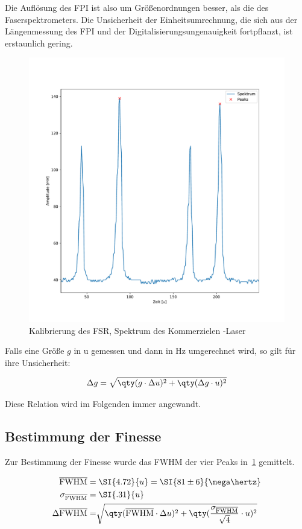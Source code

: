 \documentclass[slug=GL, room=HZDR\ Dresden/Rossendorf\,\ Geb.\ 620/123, supervisor=Tim\ Ziegler]{../../Lab_Report_LaTeX/lab_report}
\newcommand{\hne}{\ce{HeNe}-Laser}
\begin{document}
Die Aufl\"osung des FPI ist also um Gr\"o\ss{}enordnungen besser, als
die des Faserspektrometers.  Die Unsicherheit der Einheitsumrechnung,
die sich aus der L\"angenmessung des FPI und der
Digitalisierungsungenauigkeit fortpflanzt, ist erstaunlich gering.

\begin{figure}[b]\centering
  \includegraphics[width=.8\columnwidth]{figs/fsrkalib.pdf}
  \caption{Kalibrierung des FSR, Spektrum des Kommerzielen \hne{}}
  \label{fig:fsrkalib}
\end{figure}

Falls eine Gr\"o\ss{}e \(g\) in \si{u} gemessen und dann in \si{\hertz}
umgerechnet wird, so gilt f\"ur ihre Unsicherheit:

\begin{equation}
  \label{eq:uerr}
  \Delta g = \sqrt{\qty(g\cdot\Delta u)^2 + \qty(\Delta g\cdot u)^2}
\end{equation}

Diese Relation wird im Folgenden immer angewandt.

\subsection{Bestimmung der Finesse}
\label{sec:bestfinesse}

Zur Bestimmung der Finesse wurde das FWHM der vier Peaks
in~\ref{fig:fsrkalib} gemittelt.

\begin{align}
  \label{eq:fwhmlaser}
  \overline{\text{FWHM}} =&\; \SI{4.72}{u} = \SI{81\pm
  6}{\mega\hertz} \\
  \sigma_{\overline{\text{FWHM}}} =&\; \SI{.31}{u}\\
  \Delta\overline{\text{FWHM}} =&
  \sqrt{\qty(\overline{\text{FWHM}}\cdot\Delta u)^2 +
  \qty(\frac{\sigma_{\overline{\text{FWHM}}}}{\sqrt{4}}\cdot u)^2}
\end{align}
\end{document}
